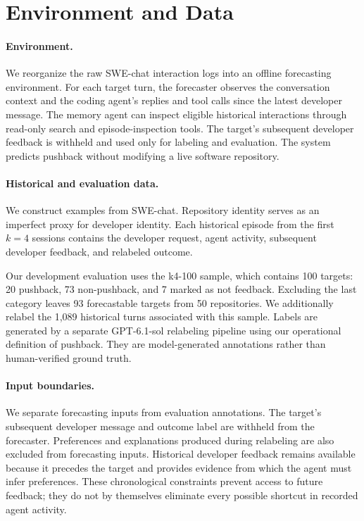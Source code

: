 \documentclass{article} %
\begin{document}
\section{Environment and Data}

\paragraph{Environment.}
We reorganize the raw SWE-chat interaction logs \citep{baumann2026swechat} into an offline forecasting environment. For each target turn, the forecaster observes the conversation context and the coding agent's replies and tool calls since the latest developer message. The memory agent can inspect eligible historical interactions through read-only search and episode-inspection tools. The target's subsequent developer feedback is withheld and used only for labeling and evaluation. The system predicts pushback without modifying a live software repository.

\paragraph{Historical and evaluation data.}
We construct examples from SWE-chat. Repository identity serves as an imperfect proxy for developer identity. Each historical episode from the first $k=4$ sessions contains the developer request, agent activity, subsequent developer feedback, and relabeled outcome.

Our development evaluation uses the k4-100 sample, which contains 100 targets: 20 pushback, 73 non-pushback, and 7 marked as not feedback. Excluding the last category leaves 93 forecastable targets from 50 repositories. We additionally relabel the 1{,}089 historical turns associated with this sample. Labels are generated by a separate GPT-6.1-sol relabeling pipeline using our operational definition of pushback. They are model-generated annotations rather than human-verified ground truth.

\paragraph{Input boundaries.}
We separate forecasting inputs from evaluation annotations. The target's subsequent developer message and outcome label are withheld from the forecaster. Preferences and explanations produced during relabeling are also excluded from forecasting inputs. Historical developer feedback remains available because it precedes the target and provides evidence from which the agent must infer preferences. These chronological constraints prevent access to future feedback; they do not by themselves eliminate every possible shortcut in recorded agent activity.
\end{document}
